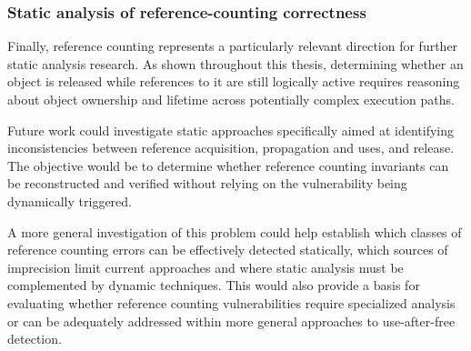 \subsubsection{Static analysis of reference-counting correctness}

Finally, reference counting represents a particularly relevant direction for further static analysis research. As shown throughout this thesis, determining whether an object is released while references to it are still logically active requires reasoning about object ownership and lifetime across potentially complex execution paths.

Future work could investigate static approaches specifically aimed at identifying inconsistencies between reference acquisition, propagation and uses, and release. The objective would be to determine whether reference counting invariants can be reconstructed and verified without relying on the vulnerability being dynamically triggered.

A more general investigation of this problem could help establish which classes of reference counting errors can be effectively detected statically, which sources of imprecision limit current approaches and where static analysis must be complemented by dynamic techniques. This would also provide a basis for evaluating whether reference counting vulnerabilities require specialized analysis or can be adequately addressed within more general approaches to use-after-free detection.
